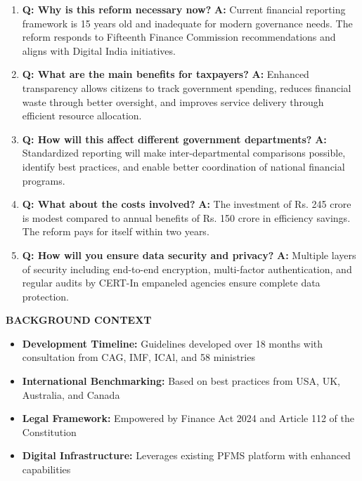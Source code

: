 \documentclass[12pt,a4paper]{article}
\newcommand{\talkingheader}[1]{\textbf{\color{govblue}#1}}
\newcommand{\question}[1]{\textbf{Q: #1}}
\newcommand{\answer}[1]{\textbf{A:} #1}
\begin{document}
\begin{enumerate}[leftmargin=*, itemsep=8pt]
    \item \question{Why is this reform necessary now?}
    \answer{Current financial reporting framework is 15 years old and inadequate for modern governance needs. The reform responds to Fifteenth Finance Commission recommendations and aligns with Digital India initiatives.}

    \item \question{What are the main benefits for taxpayers?}
    \answer{Enhanced transparency allows citizens to track government spending, reduces financial waste through better oversight, and improves service delivery through efficient resource allocation.}

    \item \question{How will this affect different government departments?}
    \answer{Standardized reporting will make inter-departmental comparisons possible, identify best practices, and enable better coordination of national financial programs.}

    \item \question{What about the costs involved?}
    \answer{The investment of Rs. 245 crore is modest compared to annual benefits of Rs. 150 crore in efficiency savings. The reform pays for itself within two years.}

    \item \question{How will you ensure data security and privacy?}
    \answer{Multiple layers of security including end-to-end encryption, multi-factor authentication, and regular audits by CERT-In empaneled agencies ensure complete data protection.}
\end{enumerate}

\vspace{0.5cm}

\talkingheader{BACKGROUND CONTEXT}

\begin{itemize}[leftmargin=*, itemsep=4pt]
    \item \textbf{Development Timeline:} Guidelines developed over 18 months with consultation from CAG, IMF, ICAl, and 58 ministries
    \item \textbf{International Benchmarking:} Based on best practices from USA, UK, Australia, and Canada
    \item \textbf{Legal Framework:} Empowered by Finance Act 2024 and Article 112 of the Constitution
    \item \textbf{Digital Infrastructure:} Leverages existing PFMS platform with enhanced capabilities
\end{itemize}
\end{document}
